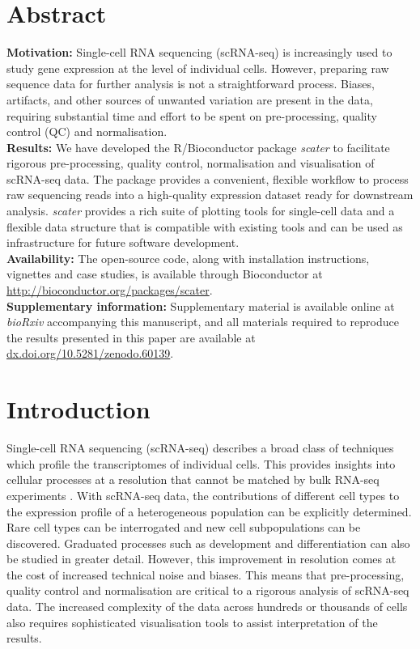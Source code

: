 \documentclass[10pt,letterpaper]{article}
\begin{document}
\section*{Abstract}
\textbf{Motivation:} Single-cell RNA sequencing (scRNA-seq) is increasingly used to study gene expression at the level of individual cells. However, preparing raw sequence data for further analysis is not a straightforward process. Biases, artifacts, and other sources of unwanted variation are present in the data, requiring substantial time and effort to be spent on pre-processing, quality control (QC) and normalisation.\\ \noindent
\textbf{Results:} We have developed the R/Bioconductor package \emph{scater} to facilitate rigorous pre-processing, quality control, normalisation and visualisation of scRNA-seq data. The package provides a convenient, flexible workflow to process raw sequencing reads into a high-quality expression dataset ready for downstream analysis. \emph{scater} provides a rich suite of plotting tools for single-cell data and a flexible data structure that is compatible with existing tools and can be used as infrastructure for future software development.\\ \noindent
\textbf{Availability:} The open-source code, along with installation instructions, vignettes and case studies, is available through Bioconductor at
\href{http://bioconductor.org/packages/scater}{http://bioconductor.org/packages/scater}.\\ \noindent
\textbf{Supplementary information:} Supplementary material is available online at \emph{bioRxiv} accompanying this manuscript, and all materials required to reproduce the results presented in this paper are available at \href{http://dx.doi.org/10.5281/zenodo.60139}{dx.doi.org/10.5281/zenodo.60139}.


\linenumbers


\section*{Introduction}\label{introduction}

Single-cell RNA sequencing (scRNA-seq) describes a broad class of techniques which profile the transcriptomes of individual cells. This provides insights into cellular processes at a resolution that cannot be matched by bulk RNA-seq experiments \citep{Hebenstreit2011-ig,Shalek2013-kf}. With scRNA-seq data, the contributions of different cell types to the expression profile of a heterogeneous population can be explicitly determined. Rare cell types can be interrogated and new cell subpopulations can be discovered. Graduated processes such as development and differentiation can also be studied in greater detail. However, this improvement in resolution comes at the cost of increased technical noise and biases. This means that pre-processing, quality control and normalisation are critical to a rigorous analysis of scRNA-seq data. The increased complexity of the data across hundreds or thousands of cells also requires sophisticated visualisation tools to assist interpretation of the results.
\end{document}

